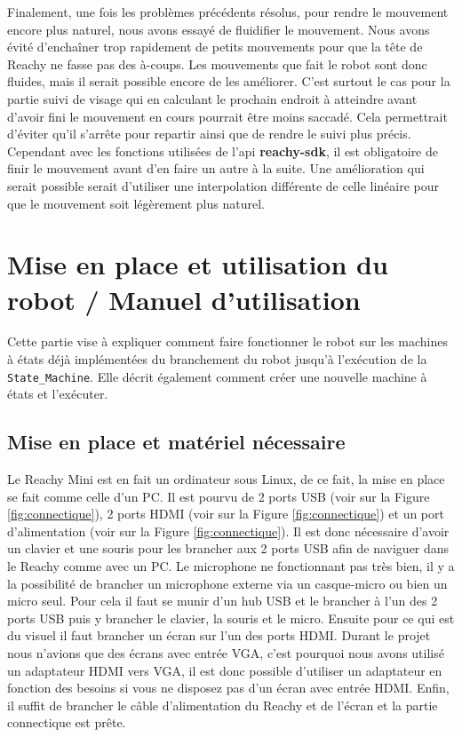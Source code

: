 \documentclass[a4paper,french]{article}
\begin{document}
Finalement, une fois les problèmes précédents résolus, pour rendre le mouvement encore plus naturel, nous avons essayé de fluidifier le mouvement. Nous avons évité d'enchaîner trop rapidement de petits mouvements pour que la tête de Reachy ne fasse pas des à-coups. Les mouvements que fait le robot sont donc fluides, mais il serait possible encore de les améliorer. C'est surtout le cas pour la partie suivi de visage qui en calculant le prochain endroit à atteindre avant d'avoir fini le mouvement en cours pourrait être moins saccadé. Cela permettrait d'éviter qu'il s'arrête pour repartir ainsi que de rendre le suivi plus précis. Cependant avec les fonctions utilisées de l'api \textbf{reachy-sdk}, il est obligatoire de finir le mouvement avant d'en faire un autre à la suite. Une amélioration qui serait possible serait d'utiliser une interpolation différente de celle linéaire pour que le mouvement soit légèrement plus naturel.

\section{Mise en place et utilisation du robot / Manuel d'utilisation}

Cette partie vise à expliquer comment faire fonctionner le robot sur les machines à états déjà implémentées du branchement du robot jusqu'à l'exécution de la \texttt{State\_Machine}. Elle décrit également comment créer une nouvelle machine à états et l'exécuter. 

\subsection{Mise en place et matériel nécessaire}
Le Reachy Mini est en fait un ordinateur sous Linux, de ce fait, la mise en place se fait comme celle d'un PC. Il est pourvu de 2 ports USB  (voir \texttt{\color{red}{(2)}} sur la Figure \ref{fig:connectique}), 2 ports HDMI  (voir \texttt{\color{red}{(3)}} sur la Figure \ref{fig:connectique}) et un port d'alimentation (voir \texttt{\color{red}{(1)}} sur la Figure \ref{fig:connectique}). Il est donc nécessaire d'avoir un clavier et une souris pour les brancher aux 2 ports USB afin de naviguer dans le Reachy comme avec un PC. Le microphone ne fonctionnant pas très bien, il y a la possibilité de brancher un microphone externe via un casque-micro ou bien un micro seul. Pour cela il faut se munir d'un hub USB et le brancher à l'un des 2 ports USB puis y brancher le clavier, la souris et le micro. Ensuite pour ce qui est du visuel il faut brancher un écran sur l'un des ports HDMI. Durant le projet nous n'avions que des écrans avec entrée VGA, c'est pourquoi nous avons utilisé un adaptateur HDMI vers VGA, il est donc possible d'utiliser un adaptateur en fonction des besoins si vous ne disposez pas d'un écran avec entrée HDMI. Enfin, il suffit de brancher le câble d'alimentation du Reachy et de l'écran et la partie connectique est prête.
\end{document}
